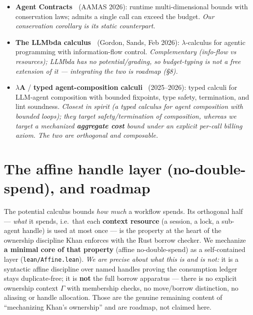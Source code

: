 \documentclass[11pt]{article}
\theoremstyle{plain}
\begin{document}
\begin{itemize}
  \emph{Our delegation split adapts this to sub-agents.}
\item \textbf{Agent Contracts~\cite{agentcontracts2026}} (AAMAS 2026): runtime multi-dimensional
  bounds with conservation laws; admits a single call can exceed the budget. \emph{Our conservation
  corollary is its static counterpart.}
\item \textbf{The LLMbda calculus~\cite{llmbda2026}} (Gordon, Sands, Feb 2026): $\lambda$-calculus
  for agentic programming with information-flow control. \emph{Complementary (info-flow vs
  resources); LLMbda has no potential/grading, so budget-typing is not a free extension of it ---
  integrating the two is roadmap (\S8).}
\item \boldmath$\lambda$\textbf{A} / \textbf{typed agent-composition calculi}~\cite{lambdaA2026}
  \unboldmath(2025--2026): typed calculi for LLM-agent composition with bounded fixpoints, type
  safety, termination, and lint soundness. \emph{Closest in spirit (a typed calculus for agent
  composition with bounded loops); they target safety/termination of composition, whereas we target
  a mechanized \textbf{aggregate cost} bound under an explicit per-call billing axiom. The two are
  orthogonal and composable.}
\end{itemize}

\section{The affine handle layer (no-double-spend), and roadmap}

The potential calculus bounds \emph{how much} a workflow spends. Its orthogonal half --- \emph{what}
it spends, i.e.\ that each \textbf{context resource} (a session, a lock, a sub-agent handle) is
used at most once --- is the property at the heart of the ownership discipline Khan enforces with
the Rust borrow checker. We mechanize \textbf{a minimal core of that property} (affine
no-double-spend) as a self-contained layer (\texttt{lean/Affine.lean}). \emph{We are precise about what this is and is
not:} it is a syntactic affine discipline over named handles proving the consumption ledger stays
duplicate-free; it is \textbf{not} the full borrow apparatus --- there is no explicit ownership
context $\Gamma$ with membership checks, no move/borrow distinction, no aliasing or handle
allocation. Those are the genuine remaining content of ``mechanizing Khan's ownership'' and are
roadmap, not claimed here.
\end{document}
